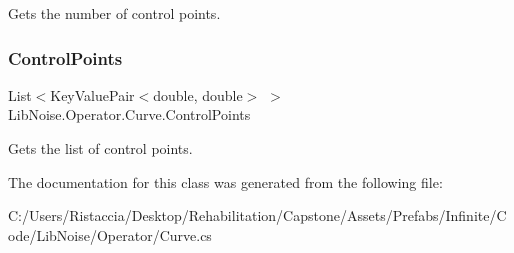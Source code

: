 Gets the number of control points. 

\mbox{\label{class_lib_noise_1_1_operator_1_1_curve_a2305c68faee6abf84bbc572ef0da509b}} 
\subsubsection{\texorpdfstring{Control\+Points}{ControlPoints}}
{\footnotesize\ttfamily List$<$Key\+Value\+Pair$<$double, double$>$ $>$ Lib\+Noise.\+Operator.\+Curve.\+Control\+Points\hspace{0.3cm}{\ttfamily [get]}}



Gets the list of control points. 



The documentation for this class was generated from the following file\+:\begin{DoxyCompactItemize}
\item 
C\+:/\+Users/\+Ristaccia/\+Desktop/\+Rehabilitation/\+Capstone/\+Assets/\+Prefabs/\+Infinite/\+Code/\+Lib\+Noise/\+Operator/Curve.\+cs\end{DoxyCompactItemize}
